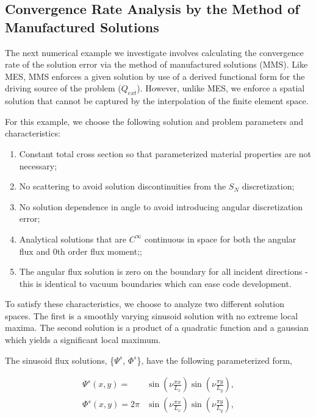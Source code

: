 \subsection{Convergence Rate Analysis by the Method of Manufactured Solutions}
\label{sec::BF_Results_MMS}

The next numerical example we investigate involves calculating the convergence rate of the solution error via the method of manufactured solutions (MMS). Like MES, MMS enforces a given solution by use of a derived functional form for the driving source of the problem ($Q_{ext}$). However, unlike MES, we enforce a spatial solution that cannot be captured by the interpolation of the finite element space. 

For this example, we choose the following solution and problem parameters and characteristics:

\begin{enumerate}
	\item Constant total cross section so that parameterized material properties are not necessary;
	\item No scattering to avoid solution discontinuities from the $S_N$ discretization;
	\item No solution dependence in angle to avoid introducing angular discretization error;
	\item Analytical solutions that are $C^{\infty}$ continuous in space for both the angular flux and 0th order flux moment;;
	\item The angular flux solution is zero on the boundary for all incident directions - this is identical to vacuum boundaries which can ease code development.
\end{enumerate}

\noindent To satisfy these characteristics, we choose to analyze two different solution spaces. The first is a smoothly varying sinusoid solution with no extreme local maxima. The second solution is a product of a quadratic function and a gaussian which yields a significant local maximum. 

The sinusoid flux solutions, \{$\Psi^s$, $\Phi^s$\}, have the following parameterized form,

\begin{equation}
\label{eq::BF_Results_MMS_sinefluxsols}
\begin{aligned}
\Psi^s (x,y) = &\sin(\nu  \frac{\pi x}{L_x}) \sin(\nu  \frac{\pi y}{L_y}), \\ 
\Phi^s (x,y) = 2 \pi &\sin(\nu  \frac{\pi x}{L_x}) \sin(\nu  \frac{\pi y}{L_y}),
\end{aligned} 
\end{equation}

